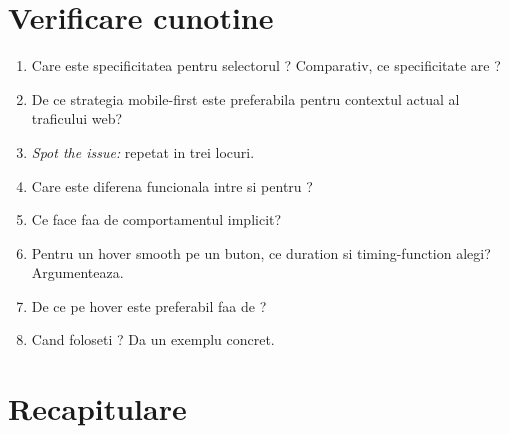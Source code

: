 \section*{Verificare cunotine}

\begin{selfcheck}
\begin{enumerate}[itemsep=2pt]
  \item Care este specificitatea pentru selectorul ? Comparativ, ce specificitate are ?
  \item De ce strategia mobile-first este preferabila pentru contextul actual al traficului web?
  \item \emph{Spot the issue:}  repetat in trei locuri.
  \item Care este diferena funcionala intre  si  pentru ?
  \item Ce face  faa de comportamentul implicit?
  \item Pentru un hover smooth pe un buton, ce duration si timing-function alegi? Argumenteaza.
  \item De ce  pe hover este preferabil faa de ?
  \item Cand foloseti ? Da un exemplu concret.
\end{enumerate}
\end{selfcheck}

\section*{Recapitulare}

